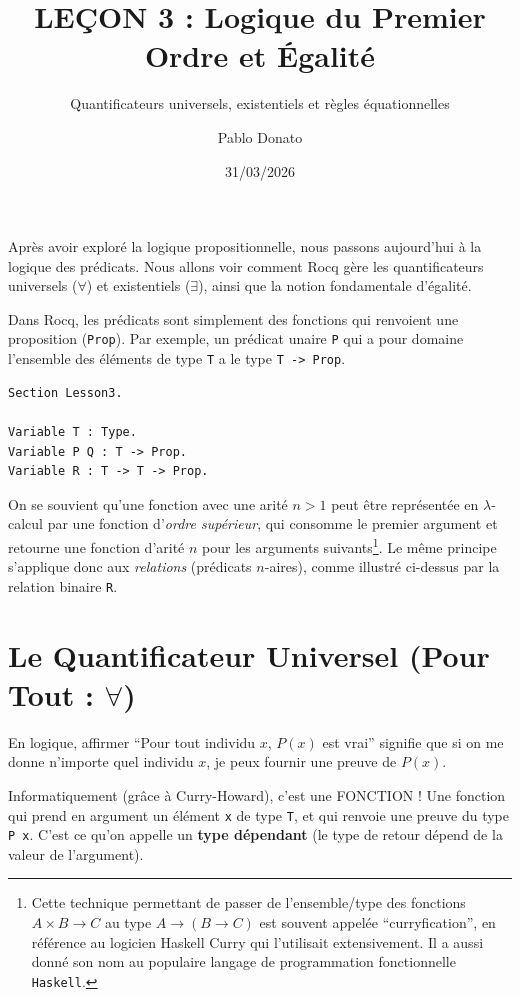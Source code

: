 \documentclass[11pt,a4paper]{article}
\title{LEÇON 3 : Logique du Premier Ordre et Égalité}
\subtitle{Quantificateurs universels, existentiels et règles équationnelles}
\date{31/03/2026}
\author{Pablo Donato}
\makeatletter
\let\oldmaketitle\maketitle
\renewcommand{\maketitle}{%
  \let\oldtitle\@title
  \renewcommand{\@title}{\oldtitle\\[1em]\Large\normalfont\@subtitle}%
  \oldmaketitle
}
\makeatother
\begin{document}
\maketitle

Après avoir exploré la logique propositionnelle, nous passons aujourd'hui à la logique des prédicats. Nous allons voir comment Rocq gère les quantificateurs universels ($\forall$) et existentiels ($\exists$), ainsi que la notion fondamentale d'égalité.

Dans Rocq, les prédicats sont simplement des fonctions qui renvoient une proposition (\texttt{Prop}). Par exemple, un prédicat unaire \texttt{P} qui a pour domaine l'ensemble des éléments de type \texttt{T} a le type \texttt{T -> Prop}.

\begin{lstlisting}
Section Lesson3.

Variable T : Type.
Variable P Q : T -> Prop.
Variable R : T -> T -> Prop.
\end{lstlisting}

On se souvient qu'une fonction avec une arité $n > 1$ peut être représentée en $\lambda$-calcul par une fonction d'\emph{ordre supérieur}, qui consomme le premier argument et retourne une fonction d'arité $n$ pour les arguments suivants\footnote{Cette technique permettant de passer de l'ensemble/type des fonctions $A \times B \to C$ au type $A \to (B \to C)$ est souvent appelée ``curryfication'', en référence au logicien Haskell Curry qui l'utilisait extensivement. Il a aussi donné son nom au populaire langage de programmation fonctionnelle \texttt{Haskell}.}. Le même principe s'applique donc aux \emph{relations} (prédicats $n$-aires), comme illustré ci-dessus par la relation binaire \texttt{R}.

\section{Le Quantificateur Universel (Pour Tout : $\forall$)}

En logique, affirmer ``Pour tout individu $x$, $P(x)$ est vrai'' signifie que si on me donne n'importe quel individu $x$, je peux fournir une preuve de $P(x)$.

Informatiquement (grâce à Curry-Howard), c'est une FONCTION ! Une fonction qui prend en argument un élément \texttt{x} de type \texttt{T}, et qui renvoie une preuve du type \texttt{P x}. C'est ce qu'on appelle un \textbf{type dépendant} (le type de retour dépend de la valeur de l'argument).
\end{document}
